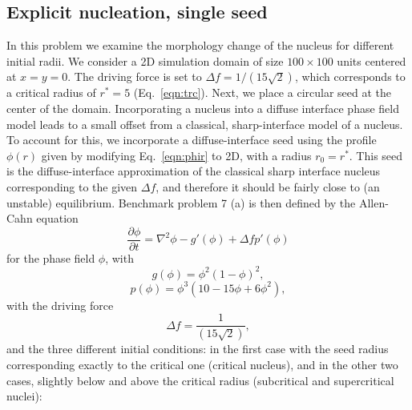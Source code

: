\documentclass[preprint,12pt]{elsarticle}
\begin{document}
\subsection{Explicit nucleation, single seed}
In this problem we examine the morphology change of the nucleus for different initial radii. We consider a 2D simulation domain of size $100 \times 100$ units centered at $x=y=0$. The driving force is set to $\Delta f = 1/(15 \sqrt{2})$, which corresponds to a critical radius of $r^*=5$ (Eq.~\ref{eqn:trc}). Next, we place a circular seed at the center of the domain. 
Incorporating a nucleus into a diffuse interface phase field model leads to a small offset from a classical, sharp-interface model of a nucleus. To account for this,
we incorporate a diffuse-interface seed using the profile $\phi(r)$ given by modifying Eq.~\ref{eqn:phir} to 2D, with a radius $r_0=r^*$. This seed is the diffuse-interface approximation of the classical sharp interface nucleus corresponding to the given $\Delta f$, and therefore it should be fairly close to (an unstable) equilibrium. 
Benchmark problem 7 (a) is then defined by the Allen-Cahn equation
\begin{equation}
    \frac{\partial \phi}{\partial {t}}={\nabla}^2\phi-g'(\phi)+{\Delta f}p'(\phi)
    \label{eqn:dphidtt_2}
\end{equation}
for the phase field $\phi$, 
with 
\begin{equation}
    g(\phi)=\phi^2(1-\phi)^2,
\end{equation}
\begin{equation}
    p(\phi)=\phi^3(10-15\phi+6\phi^2),
\end{equation}
with the driving force
\begin{equation}
   \Delta f = \frac{1}{(15 \sqrt{2})},
\end{equation}
and the three different initial conditions: in the first case with the seed radius corresponding exactly to the critical one (critical nucleus), and in the other two cases, slightly below and above the critical radius (subcritical and supercritical nuclei):
\end{document}
